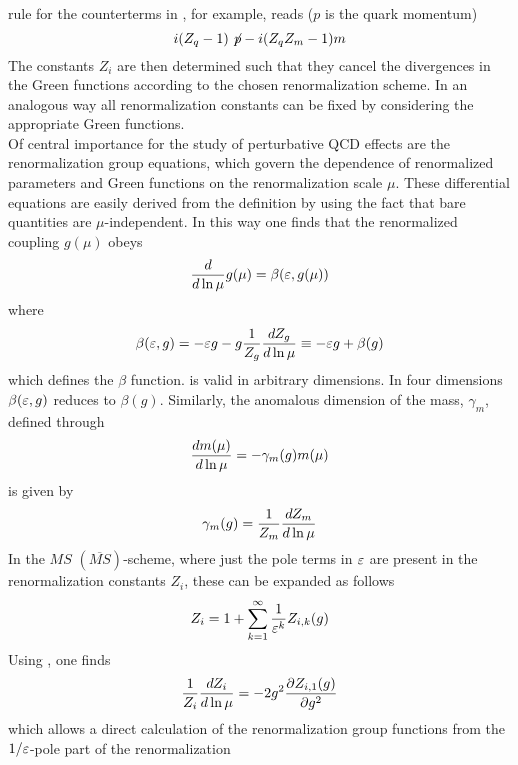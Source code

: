 rule for the counterterms in , for example, reads
($p$ is the quark momentum)
\begin{equation}\label{ctex}
i(Z_q-1)\not\! p - i(Z_q Z_m-1) m   \end{equation}
The constants $Z_i$ are then determined such that they cancel the
divergences in the Green functions according to the chosen
renormalization scheme. In an analogous way all renormalization constants
can be fixed by considering the appropriate Green functions.
\\
Of central importance for the study of perturbative QCD effects are
the renormalization group equations, which govern the dependence of
renormalized parameters and Green functions on the renormalization
scale $\mu$. These differential equations are easily derived from the
definition  by using the fact that bare quantities are
$\mu$-independent. In this way one finds that the renormalized
coupling $g(\mu)$ obeys \cite{gross:76}
\begin{equation}\label{rgbe}
{d\over d\ln\mu}g(\mu)=\beta(\varepsilon, g(\mu))  \end{equation}
where
\begin{equation}\label{bete}
\beta(\varepsilon, g)=-\varepsilon g-g{1\over Z_g}{d Z_g\over d\ln\mu}\equiv
-\varepsilon g+\beta(g)  \end{equation}
which defines the $\beta$ function.  is valid in arbitrary
dimensions. In four dimensions $\beta(\varepsilon, g)$ reduces to $\beta(g)$.
Similarly, the anomalous dimension of the mass, $\gamma_m$,
defined through
\begin{equation}\label{rggm}
{d m(\mu)\over d\ln\mu}=-\gamma_m(g) m(\mu)  \end{equation}
is given by
\begin{equation}\label{gamz} \gamma_m(g)={1\over Z_m}{d Z_m\over d\ln\mu}  \end{equation}
In the $MS$ $(\overline{MS})$-scheme, where just the pole terms in $\varepsilon$ are
present in the renorma\-lization constants $Z_i$, these can be expanded
as follows
\begin{equation}\label{ziep}
Z_i=1+\sum^\infty_{k=1} {1\over \varepsilon^k} Z_{i, k}(g)  \end{equation}
Using ,  one finds
\begin{equation}\label{zi1}
{1\over Z_i}{d Z_i\over d\ln\mu}=-2 g^2{\partial Z_{i, 1}(g)\over\partial g^2}\end{equation}
which allows a direct calculation of the renormalization group
functions from the $1/\varepsilon$-pole part of the renormalization
